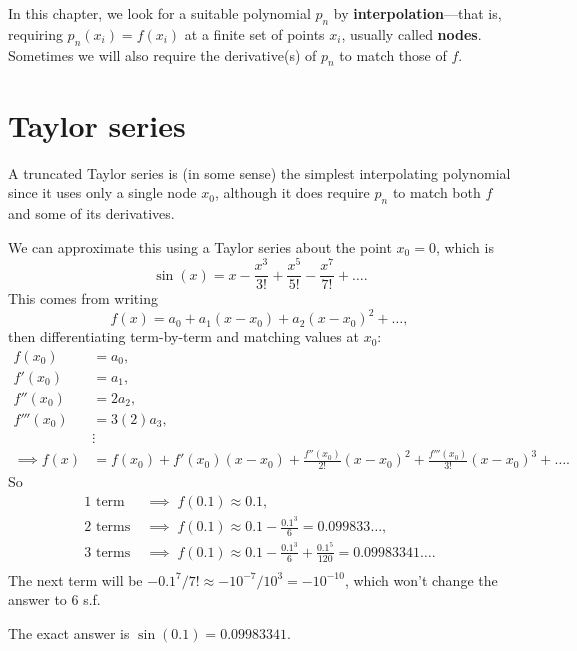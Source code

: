 \documentclass[
  letterpaper,
  DIV=11,
  numbers=noendperiod]{scrreprt}
\begin{document}
In this chapter, we look for a suitable polynomial \(p_n\) by
\textbf{interpolation}---that is, requiring \(p_n(x_i) = f(x_i)\) at a
finite set of points \(x_i\), usually called \textbf{nodes}. Sometimes
we will also require the derivative(s) of \(p_n\) to match those of
\(f\).

\section*{Taylor series}\label{taylor-series}


A truncated Taylor series is (in some sense) the simplest interpolating
polynomial since it uses only a single node \(x_0\), although it does
require \(p_n\) to match both \(f\) and some of its derivatives.

We can approximate this using a Taylor series about the point \(x_0=0\),
which is \[
\sin(x) = x - \frac{x^3}{3!} + \frac{x^5}{5!} - \frac{x^7}{7!} + \ldots.
\] This comes from writing \[
f(x) = a_0 + a_1(x-x_0) + a_2(x-x_0)^2 + \ldots,
\] then differentiating term-by-term and matching values at \(x_0\):
\begin{align*}
f(x_0) &= a_0,\\
f'(x_0) &= a_1,\\
f''(x_0) &= 2a_2,\\
f'''(x_0) &= 3(2)a_3,\\
&\vdots\\
\implies f(x) &= f(x_0) + f'(x_0)(x-x_0) + \frac{f''(x_0)}{2!}(x-x_0)^2 + \frac{f'''(x_0)}{3!}(x-x_0)^3 + \ldots.
\end{align*} So \begin{align*}
\textrm{1 term} \;&\implies\; f(0.1) \approx 0.1,\\
\textrm{2 terms} \;&\implies\; f(0.1) \approx 0.1 - \frac{0.1^3}{6} = 0.099833\ldots,\\
\textrm{3 terms} \;&\implies\; f(0.1) \approx 0.1 - \frac{0.1^3}{6} + \frac{0.1^5}{120} = 0.09983341\ldots.\\
\end{align*} The next term will be
\(-0.1^7/7! \approx -10^{-7}/10^3 = -10^{-10}\), which won't change the
answer to 6 s.f.

\begin{tcolorbox}[enhanced jigsaw, bottomtitle=1mm, title=\textcolor{quarto-callout-note-color}{\faInfo}\hspace{0.5em}{Note}, colback=white, opacityback=0, rightrule=.15mm, bottomrule=.15mm, colbacktitle=quarto-callout-note-color!10!white, colframe=quarto-callout-note-color-frame, arc=.35mm, breakable, coltitle=black, leftrule=.75mm, left=2mm, toptitle=1mm, toprule=.15mm, titlerule=0mm, opacitybacktitle=0.6]

The exact answer is \(\sin(0.1)=0.09983341\).

\end{tcolorbox}
\end{document}
